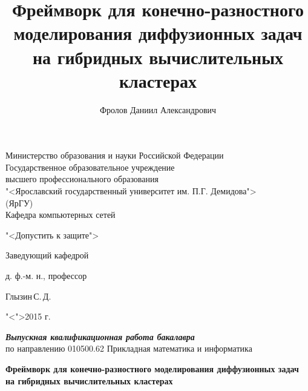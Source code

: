 \documentclass[a4paper, 14pt]{extarticle}
\title{Фреймворк для конечно-разностного моделирования диффузионных задач на гибридных вычислительных кластерах}
\author{Фролов Даниил Александрович}
\theoremstyle{definition}
\begin{document}
\setcounter{tocdepth}{3}

\makeatletter
\AtEndDocument{%
	\addtocounter{totfigures}{\value{figure}}%
	\addtocounter{tottables}{\value{table}}%
	\addtocounter{totsections}{\value{section}}%
	\immediate\write\@mainaux{%
		\string\gdef\string\totfig{\number\value{totfigures}}%
		\string\gdef\string\tottab{\number\value{tottables}}%
		\string\gdef\string\totsections{\number\value{totsections}}%
	}%
}
\makeatother


{
\thispagestyle{empty}

\begin{center}
	
	Министерство образования и науки Российской Федерации\\[0.3cm]
	Государственное образовательное учреждение\\
	высшего профессионального образования\\
	"<Ярославский государственный университет им. П.Г. Демидова">\\
	(ЯрГУ)\\[0.3cm]
	
	Кафедра компьютерных сетей
	
	\bigskip
	
	\hspace{15em}"<Допустить к защите">
	
	\begin{flushright}
		Заведующий кафедрой\par
		д. ф.-м. н., профессор\par
		\underline{\hspace{3.2cm}}Глызин\,С.\,Д.\par
		"<\underline{\hspace{0.5cm}}">\underline{\hspace{3.4cm}}2015 г.\par
	\end{flushright}
	
	\bigskip
	
	{\textbf
		{\textit
			{Выпускная квалификационная работа бакалавра}
		}
	}
	\\
	по направлению 010500.62 Прикладная математика и информатика
	
	\bigskip
	
	{\bf
		Фреймворк для конечно-разностного моделирования диффузионных задач на гибридных вычислительных кластерах 
	}
\end{center}

}
\end{document}
